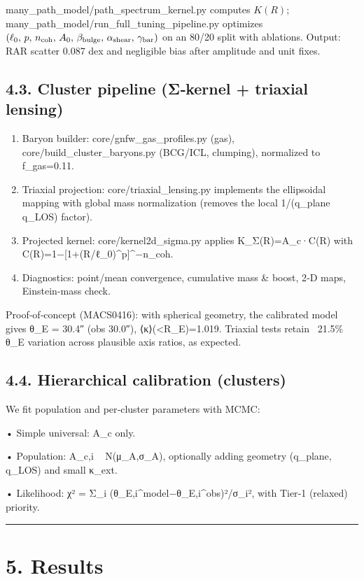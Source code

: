 \documentclass[11pt,a4paper]{article}
\begin{document}
many\_path\_model/path\_spectrum\_kernel.py computes $K(R)$; many\_path\_model/run\_full\_tuning\_pipeline.py optimizes $(\ell_0,\,p,\,n_{\rm coh},\,A_0,\,\beta_{\rm bulge},\,\alpha_{\rm shear},\,\gamma_{\rm bar})$ on an 80/20 split with ablations. Output: RAR scatter 0.087 dex and negligible bias after amplitude and unit fixes.


\subsection{4.3. Cluster pipeline (Σ‑kernel + triaxial lensing)}


\begin{enumerate}
\item Baryon builder: core/gnfw\_gas\_profiles.py (gas), core/build\_cluster\_baryons.py (BCG/ICL, clumping), normalized to f\_gas=0.11.
\item Triaxial projection: core/triaxial\_lensing.py implements the ellipsoidal mapping with global mass normalization (removes the local 1/(q\_plane q\_LOS) factor).
\item Projected kernel: core/kernel2d\_sigma.py applies K\_Σ(R)=A\_c·C(R) with C(R)=1−[1+(R/ℓ\_0)^p]^{−n\_coh}.
\item Diagnostics: point/mean convergence, cumulative mass \& boost, 2‑D maps, Einstein‑mass check.
\end{enumerate}


Proof‑of‑concept (MACS0416): with spherical geometry, the calibrated model gives θ\_E = 30.4″ (obs 30.0″), ⟨κ⟩(<R\_E)=1.019. Triaxial tests retain ~21.5\% θ\_E variation across plausible axis ratios, as expected.


\subsection{4.4. Hierarchical calibration (clusters)}


We fit population and per‑cluster parameters with MCMC:  

• Simple universal: A\_c only.  

• Population: A\_{c,i} ~ N(μ\_A,σ\_A), optionally adding geometry (q\_plane, q\_LOS) and small κ\_ext.  

• Likelihood: χ² = Σ\_i (θ\_{E,i}^{model}−θ\_{E,i}^{obs})²/σ\_i², with Tier‑1 (relaxed) priority.


\medskip\hrule\medskip


\section{5. Results}
\end{document}
